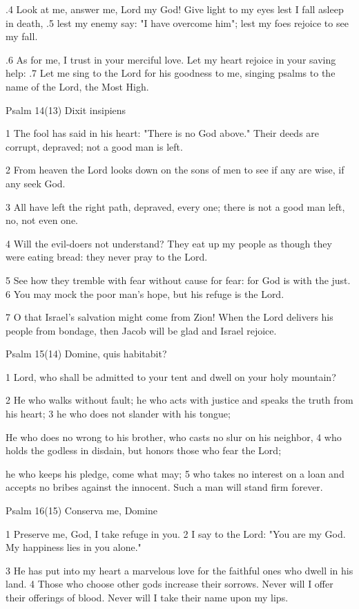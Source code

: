 .4 Look at me, answer me, Lord my God!
Give light to my eyes lest I fall asleep in death,
.5 lest my enemy say: "I have overcome him";
lest my foes rejoice to see my fall.

.6 As for me, I trust in your merciful love.
Let my heart rejoice in your saving help:
.7 Let me sing to the Lord for his goodness to me,
singing psalms to the name of the Lord, the Most High.



Psalm 14(13) Dixit insipiens

1 The fool has said in his heart:
"There is no God above."
Their deeds are corrupt, depraved;
not a good man is left.

2 From heaven the Lord looks down
on the sons of men
to see if any are wise,
if any seek God.

3 All have left the right path,
depraved, every one;
there is not a good man left,
no, not even one.

4 Will the evil-doers not understand?
They eat up my people
as though they were eating bread:
they never pray to the Lord.

5 See how they tremble with fear
without cause for fear:
for God is with the just.
6 You may mock the poor man's hope,
but his refuge is the Lord.

7 O that Israel's salvation might come from Zion!
When the Lord delivers his people from bondage,
then Jacob will be glad and Israel rejoice.


Psalm 15(14) Domine, quis habitabit?

1 Lord, who shall be admitted to your tent
and dwell on your holy mountain?

2 He who walks without fault;
he who acts with justice
and speaks the truth from his heart;
3 he who does not slander with his tongue;

He who does no wrong to his brother,
who casts no slur on his neighbor,
4 who holds the godless in disdain,
but honors those who fear the Lord;

he who keeps his pledge, come what may;
5 who takes no interest on a loan
and accepts no bribes against the innocent.
Such a man will stand firm forever.


Psalm 16(15) Conserva me, Domine

1 Preserve me, God, I take refuge in you.
2 I say to the Lord: "You are my God.
My happiness lies in you alone."

3 He has put into my heart a marvelous love
for the faithful ones who dwell in his land.
4 Those who choose other gods increase their sorrows.
Never will I offer their offerings of blood.
Never will I take their name upon my lips.


